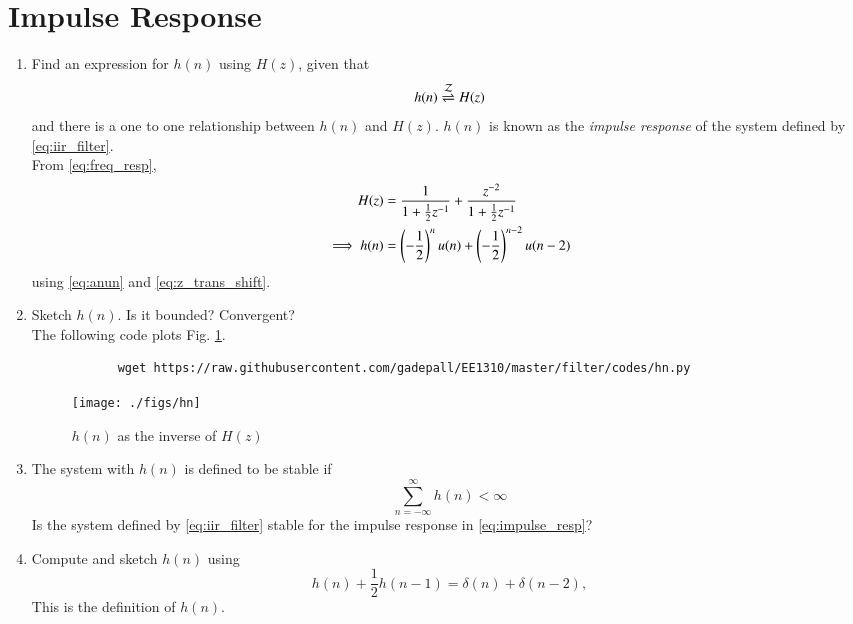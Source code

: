\documentclass[journal,12pt,twocolumn]{IEEEtran}
\renewcommand\thesection{\arabic{section}}
\begin{document}
	\section{Impulse Response}
	\begin{enumerate}[label=\thesection.\arabic*]
		\item \label{prob:impulse_resp}
		Find an expression for $h(n)$ using $H(z)$, given that 
		\begin{equation}
			\label{eq:impulse_resp}
			h(n) \overset{\mathcal{Z}}{ \rightleftharpoons} H(z)
		\end{equation}
		and there is a one to one relationship between $h(n)$ and $H(z)$. $h(n)$ is known as the {\em impulse response} of the
		system defined by \eqref{eq:iir_filter}.
		\\
		\solution From \eqref{eq:freq_resp},
		\begin{align}
			H(z) &= \frac{1}{1 + \frac{1}{2}z^{-1}} + \frac{ z^{-2}}{1 + \frac{1}{2}z^{-1}}
			\\
			\implies h(n) &= \left(-\frac{1}{2}\right)^{n}u(n) + \left(-\frac{1}{2}\right)^{n-2}u(n-2)
		\end{align}
		using \eqref{eq:anun} and \eqref{eq:z_trans_shift}.
		\item Sketch $h(n)$. Is it bounded? Convergent? 
		\\
		\solution The following code plots Fig. \ref{fig:hn}.
		\begin{lstlisting}
			wget https://raw.githubusercontent.com/gadepall/EE1310/master/filter/codes/hn.py
		\end{lstlisting}
		\begin{figure}[!ht]
			\centering
			\texttt{[image: ./figs/hn]}
			\caption{$h(n)$ as the inverse of $H(z)$}
			\label{fig:hn}
		\end{figure}
		\item The system with $h(n)$ is defined to be stable if
		\begin{equation}
			\sum_{n=-\infty}^{\infty}h(n) < \infty
		\end{equation}
		Is the system defined by \eqref{eq:iir_filter} stable for the impulse response in \eqref{eq:impulse_resp}?
		\item 
		Compute and sketch $h(n)$ using 
		\begin{equation}
			\label{eq:iir_filter_h}
			h(n) + \frac{1}{2}h(n-1) = \delta(n) + \delta(n-2), 
		\end{equation}
		This is the definition of $h(n)$.
		\\

\end{enumerate}
\end{document}
